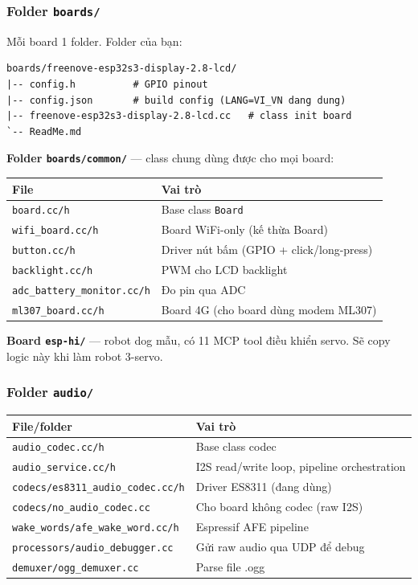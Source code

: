 \documentclass[11pt,a4paper]{article}
\begin{document}
\subsubsection{Folder \texttt{boards/}}
Mỗi board 1 folder. Folder của bạn:
\begin{lstlisting}
boards/freenove-esp32s3-display-2.8-lcd/
|-- config.h          # GPIO pinout
|-- config.json       # build config (LANG=VI_VN dang dung)
|-- freenove-esp32s3-display-2.8-lcd.cc   # class init board
`-- ReadMe.md
\end{lstlisting}

\textbf{Folder \texttt{boards/common/}} — class chung dùng được cho mọi board:
\begin{tabularx}{\textwidth}{l|Y}
\toprule
\textbf{File} & \textbf{Vai trò}\\
\midrule
\texttt{board.cc/h} & Base class \texttt{Board}\\
\texttt{wifi\_board.cc/h} & Board WiFi-only (kế thừa Board)\\
\texttt{button.cc/h} & Driver nút bấm (GPIO + click/long-press)\\
\texttt{backlight.cc/h} & PWM cho LCD backlight\\
\texttt{adc\_battery\_monitor.cc/h} & Đo pin qua ADC\\
\texttt{ml307\_board.cc/h} & Board 4G (cho board dùng modem ML307)\\
\bottomrule
\end{tabularx}

\textbf{Board \texttt{esp-hi/}} — robot dog mẫu, có 11 MCP tool điều khiển servo. Sẽ copy logic này khi làm robot 3-servo.

\subsubsection{Folder \texttt{audio/}}
\begin{tabularx}{\textwidth}{l|Y}
\toprule
\textbf{File/folder} & \textbf{Vai trò}\\
\midrule
\texttt{audio\_codec.cc/h} & Base class codec\\
\texttt{audio\_service.cc/h} & I2S read/write loop, pipeline orchestration\\
\texttt{codecs/es8311\_audio\_codec.cc/h} & Driver ES8311 (đang dùng)\\
\texttt{codecs/no\_audio\_codec.cc} & Cho board không codec (raw I2S)\\
\texttt{wake\_words/afe\_wake\_word.cc/h} & Espressif AFE pipeline\\
\texttt{processors/audio\_debugger.cc} & Gửi raw audio qua UDP để debug\\
\texttt{demuxer/ogg\_demuxer.cc} & Parse file .ogg\\
\bottomrule
\end{tabularx}
\end{document}
